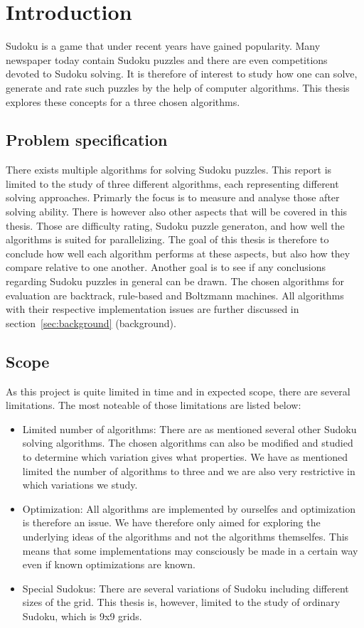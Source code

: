\documentclass[a4paper,11pt]{kth-mag}
\begin{document}
\clearpage
\tableofcontents*
\mainmatter
\pagestyle{newchap}

\chapter{Introduction}
Sudoku is a game that under recent years have gained popularity.
Many newspaper today contain Sudoku puzzles and there are even competitions devoted to Sudoku solving.
It is therefore of interest to study how one can solve, generate and rate such puzzles by the help of computer algorithms. This thesis explores these concepts for a three chosen algorithms.

\FloatBarrier
\section{Problem specification}
There exists multiple algorithms for solving Sudoku puzzles.
This report is limited to the study of three different algorithms, each representing different solving approaches.
Primarly the focus is to measure and analyse those after solving ability.
There is however also other aspects that will be covered in this thesis.
Those are difficulty rating, Sudoku puzzle generaton, and how well the algorithms is suited for parallelizing.
The goal of this thesis is therefore to conclude how well each algorithm performs at these aspects, but also how they compare relative to one another.
Another goal is to see if any conclusions regarding Sudoku puzzles in general can be drawn.
The chosen algorithms for evaluation are backtrack, rule-based and Boltzmann machines.
All algorithms with their respective implementation issues are further discussed in section~\ref{sec:background} (background).

\FloatBarrier
\section{Scope}
As this project is quite limited in time and in expected scope, 
there are several limitations. The most noteable of those limitations are listed below: 
\begin{itemize}
    \item Limited number of algorithms:
There are as mentioned several other Sudoku solving algorithms. The chosen algorithms can also be modified and studied to determine which variation gives what properties. We have as mentioned limited the number of algorithms to three and we are also very restrictive in which variations we study.  
    \item Optimization: 
All algorithms are implemented by ourselfes and optimization is therefore an issue. 
We have therefore only aimed for exploring the underlying ideas of the algorithms and not the algorithms themselfes.
This means that some implementations may consciously be made in a certain way even if known optimizations are known.

    \item Special Sudokus: There are several variations of Sudoku including different sizes of the grid.
This thesis is, however, limited to the study of ordinary Sudoku, which is 9x9 grids.
\end{itemize}
\end{document}
